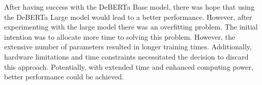 After having success with the DeBERTa Base model, there was hope that using the DeBERTa Large model would lead to a better performance.
However, after experimenting with the large model there was an overfitting problem.
The initial intention was to allocate more time to solving this problem. However, the extensive number of parameters resulted in longer training times. 
Additionally, hardware limitations and time constraints necessitated the decision to discard this approach. Potentially, with extended time and enhanced computing power, better performance could be achieved.
